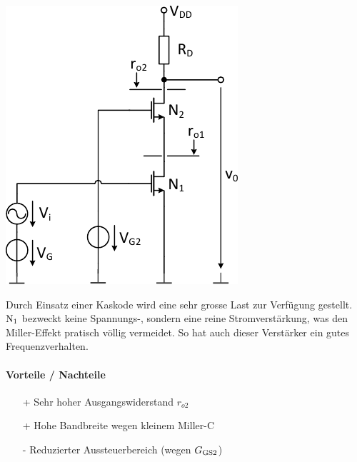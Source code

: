 \begin{minipage}[t]{0.3\columnwidth}
    \includegraphics[width=\columnwidth, align=t]{images/07_kaskodenverstaerker.pdf}
\end{minipage}
\hfill
\begin{minipage}[t]{0.66\columnwidth}
    Durch Einsatz einer Kaskode wird eine sehr grosse Last zur Verfügung gestellt. 
    $\rm N_1$ bezweckt keine Spannungs-, sondern eine reine Stromverstärkung, was den Miller-Effekt pratisch völlig vermeidet.
    So hat auch dieser Verstärker ein gutes Frequenzverhalten.

    \paragraph{Vorteile / Nachteile}
    \raggedright

     \begin{itemize}
        \item[+] Sehr hoher Ausgangswiderstand $r_{o2}$
        \item[+] Hohe Bandbreite wegen kleinem Miller-C
        \item[-] Reduzierter Aussteuerbereich (wegen $G_{\rm GS2}$)
     \end{itemize}
\end{minipage}


